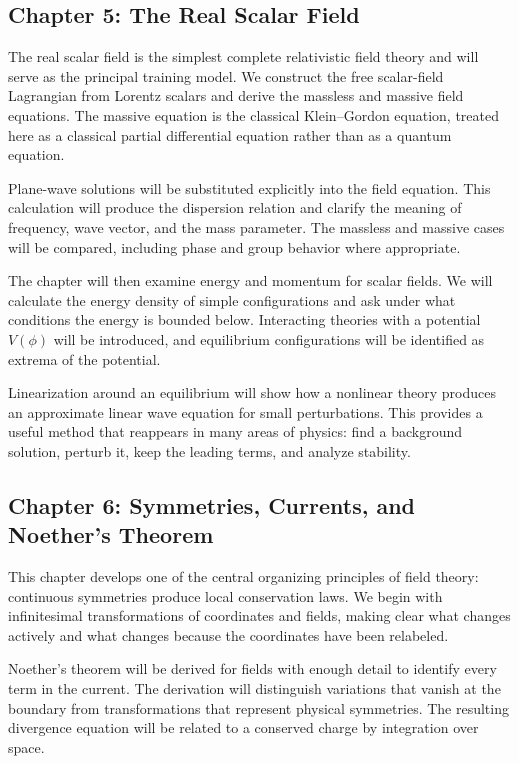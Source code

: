 \subsection*{Chapter 5: The Real Scalar Field}

The real scalar field is the simplest complete relativistic field theory and will serve as the principal training model. We construct the free scalar-field Lagrangian from Lorentz scalars and derive the massless and massive field equations. The massive equation is the classical Klein--Gordon equation, treated here as a classical partial differential equation rather than as a quantum equation.

Plane-wave solutions will be substituted explicitly into the field equation. This calculation will produce the dispersion relation and clarify the meaning of frequency, wave vector, and the mass parameter. The massless and massive cases will be compared, including phase and group behavior where appropriate.

The chapter will then examine energy and momentum for scalar fields. We will calculate the energy density of simple configurations and ask under what conditions the energy is bounded below. Interacting theories with a potential \(V(\phi)\) will be introduced, and equilibrium configurations will be identified as extrema of the potential.

Linearization around an equilibrium will show how a nonlinear theory produces an approximate linear wave equation for small perturbations. This provides a useful method that reappears in many areas of physics: find a background solution, perturb it, keep the leading terms, and analyze stability.

\subsection*{Chapter 6: Symmetries, Currents, and Noether's Theorem}

This chapter develops one of the central organizing principles of field theory: continuous symmetries produce local conservation laws. We begin with infinitesimal transformations of coordinates and fields, making clear what changes actively and what changes because the coordinates have been relabeled.

Noether's theorem will be derived for fields with enough detail to identify every term in the current. The derivation will distinguish variations that vanish at the boundary from transformations that represent physical symmetries. The resulting divergence equation will be related to a conserved charge by integration over space.

